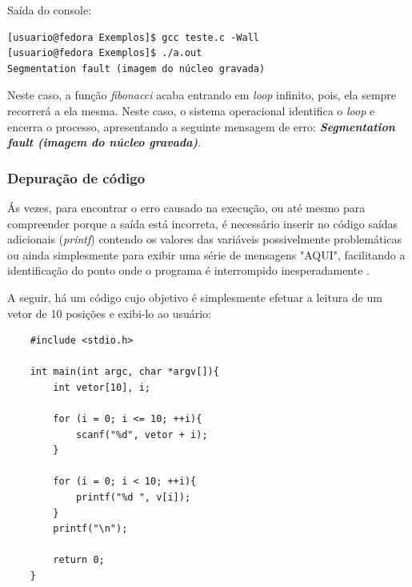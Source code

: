 \documentclass[12pt]{article}
\newcommand\tab[1][1cm]{\hspace*{#1}}
\begin{document}
\par\tab Saída do console:

\hspace{0.25cm}
\begin{tcolorbox}[colback=black!5!white,colframe=black!75!white,title=Console: usuario@fedora:\~/Exemplos]
    \begin{verbatim}
[usuario@fedora Exemplos]$ gcc teste.c -Wall
[usuario@fedora Exemplos]$ ./a.out
Segmentation fault (imagem do núcleo gravada)
    \end{verbatim}
\end{tcolorbox}

\par\tab Neste caso, a função \textit{fibonacci} acaba entrando em \textit{loop} infinito, pois, ela sempre recorrerá a ela mesma. Neste caso, o sistema operacional identifica o \textit{loop} e encerra o processo, apresentando a seguinte mensagem de erro: \textbf{\textit{Segmentation fault (imagem do núcleo gravada)}}.

\subsubsection{Depuração de código}

\par\tab Ás vezes, para encontrar o erro causado na execução, ou até mesmo para compreender porque a saída está incorreta, é necessário inserir no código saídas adicionais (\textit{printf}) contendo os valores das variáveis possivelmente problemáticas ou ainda simplesmente para exibir uma série de mensagens "AQUI", facilitando a identificação do ponto onde o programa é interrompido inesperadamente \cite{presentation:debug_c}.

\par\tab A seguir, há um código cujo objetivo é simplesmente efetuar a leitura de um vetor de 10 posições e exibi-lo ao usuário:

\hspace{0.25cm}
\begin{lstlisting}
    #include <stdio.h>
    
    int main(int argc, char *argv[]){
        int vetor[10], i;
        
        for (i = 0; i <= 10; ++i){
            scanf("%d", vetor + i);
        }
        
        for (i = 0; i < 10; ++i){
            printf("%d ", v[i]);
        }
        printf("\n");
        
        return 0;
    }
\end{lstlisting}
\end{document}
